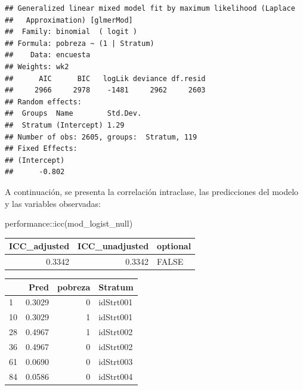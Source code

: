 \documentclass[
  12pt,
]{book}
\newenvironment{Shaded}{\begin{snugshade}}{\end{snugshade}}
\newcommand{\AttributeTok}[1]{\textcolor[rgb]{0.77,0.63,0.00}{#1}}
\newcommand{\CommentTok}[1]{\textcolor[rgb]{0.56,0.35,0.01}{\textit{#1}}}
\newcommand{\DecValTok}[1]{\textcolor[rgb]{0.00,0.00,0.81}{#1}}
\newcommand{\FunctionTok}[1]{\textcolor[rgb]{0.00,0.00,0.00}{#1}}
\newcommand{\NormalTok}[1]{#1}
\newcommand{\OtherTok}[1]{\textcolor[rgb]{0.56,0.35,0.01}{#1}}
\newcommand{\SpecialCharTok}[1]{\textcolor[rgb]{0.00,0.00,0.00}{#1}}
\newcommand{\StringTok}[1]{\textcolor[rgb]{0.31,0.60,0.02}{#1}}
\begin{document}
\begin{verbatim}
## Generalized linear mixed model fit by maximum likelihood (Laplace
##   Approximation) [glmerMod]
##  Family: binomial  ( logit )
## Formula: pobreza ~ (1 | Stratum)
##    Data: encuesta
## Weights: wk2
##      AIC      BIC   logLik deviance df.resid 
##     2966     2978    -1481     2962     2603 
## Random effects:
##  Groups  Name        Std.Dev.
##  Stratum (Intercept) 1.29    
## Number of obs: 2605, groups:  Stratum, 119
## Fixed Effects:
## (Intercept)  
##      -0.802
\end{verbatim}

A continuación, se presenta la correlación intraclase, las predicciones del modelo y las variables observadas:

\begin{Shaded}
\begin{Highlighting}[]
\NormalTok{performance}\SpecialCharTok{::}\FunctionTok{icc}\NormalTok{(mod\_logist\_null)}
\end{Highlighting}
\end{Shaded}

\begin{tabular}{r|r|l}
\hline
ICC\_adjusted & ICC\_unadjusted & optional\\
\hline
0.3342 & 0.3342 & FALSE\\
\hline
\end{tabular}

\begin{Shaded}
\end{Shaded}

\begin{tabular}{l|r|r|l}
\hline
  & Pred & pobreza & Stratum\\
\hline
1 & 0.3029 & 0 & idStrt001\\
\hline
10 & 0.3029 & 1 & idStrt001\\
\hline
28 & 0.4967 & 1 & idStrt002\\
\hline
36 & 0.4967 & 0 & idStrt002\\
\hline
61 & 0.0690 & 0 & idStrt003\\
\hline
84 & 0.0586 & 0 & idStrt004\\
\hline
\end{tabular}
\end{document}
